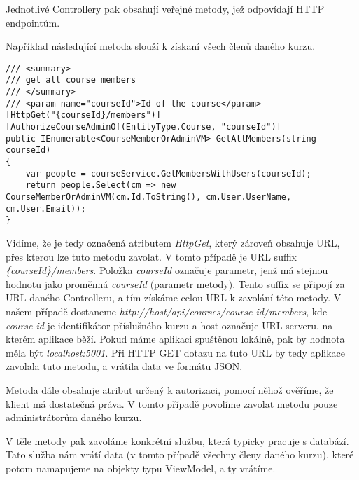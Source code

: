 Jednotlivé Controllery pak obsahují veřejné metody, jež odpovídají HTTP endpointům.

Například následující metoda slouží k získaní všech členů daného kurzu.

\begin{lstlisting}
/// <summary>
/// get all course members
/// </summary>
/// <param name="courseId">Id of the course</param>
[HttpGet("{courseId}/members")]
[AuthorizeCourseAdminOf(EntityType.Course, "courseId")]
public IEnumerable<CourseMemberOrAdminVM> GetAllMembers(string courseId)
{
	var people = courseService.GetMembersWithUsers(courseId);
	return people.Select(cm => new CourseMemberOrAdminVM(cm.Id.ToString(), cm.User.UserName, cm.User.Email));
}
\end{lstlisting}

Vidíme, že je tedy označená atributem \textit{HttpGet}, který zároveň obsahuje URL, přes kterou lze tuto metodu zavolat. V tomto případě je URL suffix \textit{\{courseId\}/members}. Položka \textit{courseId} označuje parametr, jenž má stejnou hodnotu jako proměnná \textit{courseId} (parametr metody). Tento suffix se připojí za URL daného Controlleru, a tím získáme celou URL k zavolání této metody. V našem případě dostaneme
\newline
\textit{http://host/api/courses/course-id/members}, kde \textit{course-id} je identifikátor příslušného kurzu a host označuje URL serveru, na kterém aplikace běží. Pokud máme aplikaci spuštěnou lokálně, pak by hodnota měla být \textit{localhost:5001}. Při HTTP GET dotazu na tuto URL by tedy aplikace zavolala tuto metodu, a vrátila data ve formátu JSON.

Metoda dále obsahuje atribut určený k autorizaci, pomocí něhož ověříme, že klient má dostatečná práva. V tomto případě povolíme zavolat metodu pouze administrátorům daného kurzu.

V těle metody pak zavoláme konkrétní službu, která typicky pracuje s databází. Tato služba nám vrátí data (v tomto případě všechny členy daného kurzu), které potom namapujeme na objekty typu ViewModel, a ty vrátíme.

\vspace{\baselineskip}

